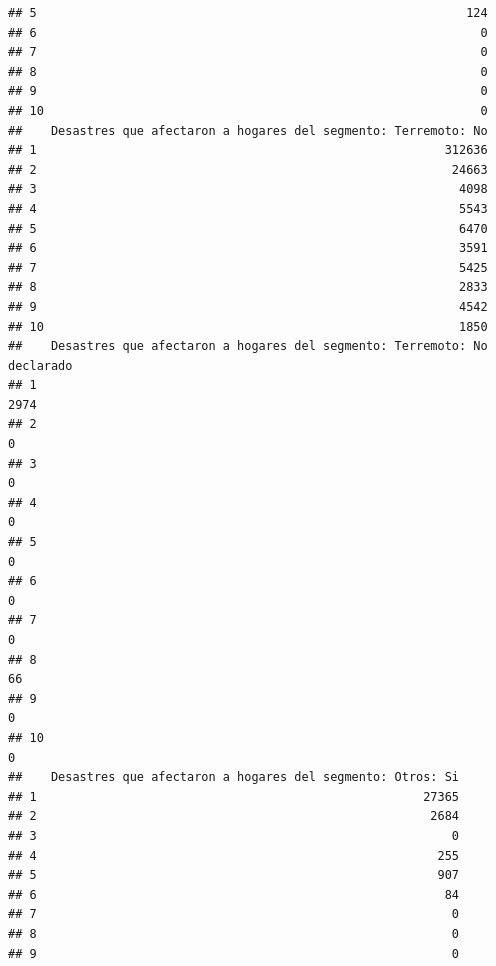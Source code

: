 \documentclass[11pt,]{article}
\begin{document}
\begin{verbatim}
## 5                                                            124
## 6                                                              0
## 7                                                              0
## 8                                                              0
## 9                                                              0
## 10                                                             0
##    Desastres que afectaron a hogares del segmento: Terremoto: No
## 1                                                         312636
## 2                                                          24663
## 3                                                           4098
## 4                                                           5543
## 5                                                           6470
## 6                                                           3591
## 7                                                           5425
## 8                                                           2833
## 9                                                           4542
## 10                                                          1850
##    Desastres que afectaron a hogares del segmento: Terremoto: No declarado
## 1                                                                     2974
## 2                                                                        0
## 3                                                                        0
## 4                                                                        0
## 5                                                                        0
## 6                                                                        0
## 7                                                                        0
## 8                                                                       66
## 9                                                                        0
## 10                                                                       0
##    Desastres que afectaron a hogares del segmento: Otros: Si
## 1                                                      27365
## 2                                                       2684
## 3                                                          0
## 4                                                        255
## 5                                                        907
## 6                                                         84
## 7                                                          0
## 8                                                          0
## 9                                                          0

\end{verbatim}
\end{document}
